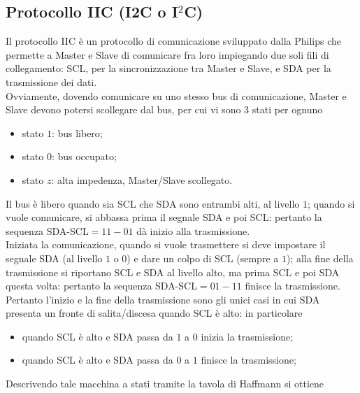 \documentclass[a4paper]{extarticle}
\begin{document}
\vspace{1em}
\subsection{Protocollo IIC (I2C o I$^2$C)}
Il protocollo IIC è un protocollo di comunicazione sviluppato dalla Philips che permette a Master e Slave di comunicare fra loro impiegando due soli fili di collegamento: SCL, per la sincronizzazione tra Master e Slave, e SDA per la trasmissione dei dati.\\
Ovviamente, dovendo comunicare su uno stesso bus di comunicazione, Master e Slave devono potersi scollegare dal bus, per cui vi sono $3$ stati per ognuno
\begin{itemize}
    \item stato $1$: bus libero;
    \item stato $0$: bus occupato;
    \item stato $z$: alta impedenza, Master/Slave scollegato.
\end{itemize}
Il bus è libero quando sia SCL che SDA sono entrambi alti, al livello $1$; quando si vuole comunicare, si abbassa prima il segnale SDA e poi SCL: pertanto la sequenza SDA-SCL$=11-01$ dà inizio alla trasmissione.\\
Iniziata la comunicazione, quando si vuole trasmettere si deve impostare il segnale SDA (al livello $1$ o $0$) e dare un colpo di SCL (sempre a $1$); alla fine della trasmissione si riportano SCL e SDA al livello alto, ma prima SCL e poi SDA questa volta: pertanto la sequenza SDA-SCL$=01-11$ finisce la trasmissione.\\
Pertanto l'inizio e la fine della trasmissione sono gli unici casi in cui SDA presenta un fronte di salita/discesa quando SCL è alto: in particolare
\begin{itemize}
    \item quando SCL è alto e SDA passa da $1$ a $0$ inizia la trasmissione;
    \item quando SCL è alto e SDA passa da $0$ a $1$ finisce la trasmissione;
\end{itemize}
Descrivendo tale macchina a stati tramite la tavola di Haffmann si ottiene
\end{document}

